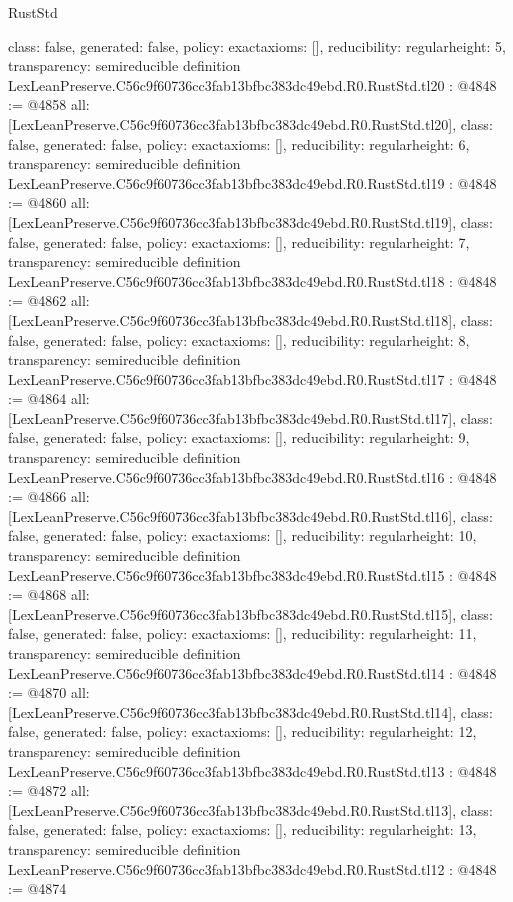 \begin{lexlean}{RustStd}
\begin{coremodule}
{  class: false,
  generated: false,
  policy: exact{axioms: []},
  reducibility: regular{height: 5},
  transparency: semireducible
}
definition LexLeanPreserve.C56c9f60736cc3fab13bfbc383dc49ebd.R0.RustStd.tl20 : @4848 := @4858 {
  all: [LexLeanPreserve.C56c9f60736cc3fab13bfbc383dc49ebd.R0.RustStd.tl20],
  class: false,
  generated: false,
  policy: exact{axioms: []},
  reducibility: regular{height: 6},
  transparency: semireducible
}
definition LexLeanPreserve.C56c9f60736cc3fab13bfbc383dc49ebd.R0.RustStd.tl19 : @4848 := @4860 {
  all: [LexLeanPreserve.C56c9f60736cc3fab13bfbc383dc49ebd.R0.RustStd.tl19],
  class: false,
  generated: false,
  policy: exact{axioms: []},
  reducibility: regular{height: 7},
  transparency: semireducible
}
definition LexLeanPreserve.C56c9f60736cc3fab13bfbc383dc49ebd.R0.RustStd.tl18 : @4848 := @4862 {
  all: [LexLeanPreserve.C56c9f60736cc3fab13bfbc383dc49ebd.R0.RustStd.tl18],
  class: false,
  generated: false,
  policy: exact{axioms: []},
  reducibility: regular{height: 8},
  transparency: semireducible
}
definition LexLeanPreserve.C56c9f60736cc3fab13bfbc383dc49ebd.R0.RustStd.tl17 : @4848 := @4864 {
  all: [LexLeanPreserve.C56c9f60736cc3fab13bfbc383dc49ebd.R0.RustStd.tl17],
  class: false,
  generated: false,
  policy: exact{axioms: []},
  reducibility: regular{height: 9},
  transparency: semireducible
}
definition LexLeanPreserve.C56c9f60736cc3fab13bfbc383dc49ebd.R0.RustStd.tl16 : @4848 := @4866 {
  all: [LexLeanPreserve.C56c9f60736cc3fab13bfbc383dc49ebd.R0.RustStd.tl16],
  class: false,
  generated: false,
  policy: exact{axioms: []},
  reducibility: regular{height: 10},
  transparency: semireducible
}
definition LexLeanPreserve.C56c9f60736cc3fab13bfbc383dc49ebd.R0.RustStd.tl15 : @4848 := @4868 {
  all: [LexLeanPreserve.C56c9f60736cc3fab13bfbc383dc49ebd.R0.RustStd.tl15],
  class: false,
  generated: false,
  policy: exact{axioms: []},
  reducibility: regular{height: 11},
  transparency: semireducible
}
definition LexLeanPreserve.C56c9f60736cc3fab13bfbc383dc49ebd.R0.RustStd.tl14 : @4848 := @4870 {
  all: [LexLeanPreserve.C56c9f60736cc3fab13bfbc383dc49ebd.R0.RustStd.tl14],
  class: false,
  generated: false,
  policy: exact{axioms: []},
  reducibility: regular{height: 12},
  transparency: semireducible
}
definition LexLeanPreserve.C56c9f60736cc3fab13bfbc383dc49ebd.R0.RustStd.tl13 : @4848 := @4872 {
  all: [LexLeanPreserve.C56c9f60736cc3fab13bfbc383dc49ebd.R0.RustStd.tl13],
  class: false,
  generated: false,
  policy: exact{axioms: []},
  reducibility: regular{height: 13},
  transparency: semireducible
}
definition LexLeanPreserve.C56c9f60736cc3fab13bfbc383dc49ebd.R0.RustStd.tl12 : @4848 := @4874 {
}
\end{coremodule}
\end{lexlean}
